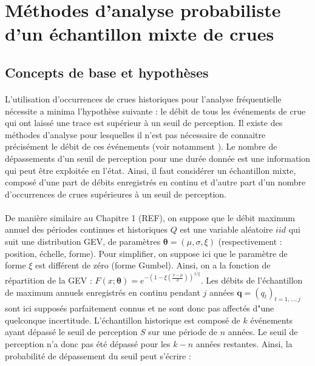 \documentclass[11pt]{article}
\begin{document}
\section{Méthodes d'analyse probabiliste d'un échantillon mixte de crues}
	
	
	\subsection{Concepts de base et hypothèses}
	
	\paragraph{} 
	
		L'utilisation d'occurrences de crues historiques pour l'analyse fréquentielle nécessite a minima l'hypothèse suivante : le débit de tous les événements de crue qui ont laissé une trace est supérieur à un seuil de perception. Il existe des méthodes d'analyse pour lesquelles il n'est pas nécessaire de connaitre précisément le débit de ces événements (voir notamment \citet{stedinger_flood_1986}). Le nombre de dépassements d'un seuil de perception pour une durée donnée est une information qui peut être exploitée en l'état. Ainsi, il faut considérer un échantillon mixte, composé d'une part de débits enregistrés en continu et d'autre part d'un nombre d'occurrences de crues supérieures à un seuil de perception. 
			
		\paragraph{}
		De manière similaire au Chapitre 1 (REF), on suppose que le débit maximum annuel des périodes continues et historiques $Q$ est une variable aléatoire $iid$ qui suit une distribution GEV, de paramètres $\boldsymbol{\theta} = (\mu,\sigma,\xi)$ (respectivement : position, échelle, forme). Pour simplifier, on suppose ici que le paramètre de forme $\xi$ est différent de zéro (forme Gumbel). Ainsi, on a la fonction de répartition de la GEV : $F(x;\boldsymbol{\theta}) = e^{-(1-\xi(\frac{x - \mu}{\sigma}))^{1/\xi}}$. Les débits de l'échantillon de maximum annuels enregistrés en continu pendant $j$ années $\boldsymbol{q}= (q_t)_{t=1,...,j}$ sont ici supposés parfaitement connus et ne sont donc pas affectés d"une quelconque incertitude. L'échantillon historique est composé de $k$ événements ayant dépassé le seuil de perception $S$ sur une période de $n$ années. Le seuil de perception n'a donc pas été dépassé pour les $k-n$ années restantes. Ainsi, la probabilité de dépassement du seuil peut s'écrire :
		
\end{document}
